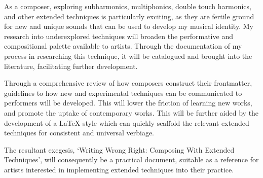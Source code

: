 As a composer, exploring subharmonics, multiphonics, double touch harmonics, and other extended techniques is particularly exciting, as they are fertile ground for new and unique sounds that can be used to develop my musical identity.
My research into underexplored techniques will broaden the performative and compositional palette available to artists. 
Through the documentation of my process in researching this technique, it will be catalogued and brought into the literature, facilitating further development.


Through a comprehensive review of how composers construct their frontmatter, guidelines to how new and experimental techniques can be communicated to performers will be developed.
This will lower the friction of learning new works, and promote the uptake of contemporary works.
This will be further aided by the development of a \LaTeX{} style which can quickly scaffold the relevant extended techniques for consistent and universal verbiage.

The resultant exegesis, `Writing Wrong Right: Composing With Extended Techniques', will consequently be a practical document, suitable as a reference for artists interested in implementing extended techniques into their practice.

